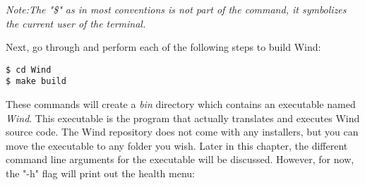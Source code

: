 \emph{Note:The "\$" as in most conventions is not part of the command, it symbolizes the current user of the terminal.}

\par Next, go through and perform each of the following steps to build Wind:

\begin{verbatim}
$ cd Wind
$ make build
\end{verbatim}

\par These commands will create a \emph{bin} directory which contains an executable named \emph{Wind}. This executable is the program that actually translates and executes Wind source code. The Wind repository does not come with any installers, but you can move the executable to any folder you wish. Later in this chapter, the different command line arguments for the executable will be discussed. However, for now, the "-h" flag will print out the health menu:

